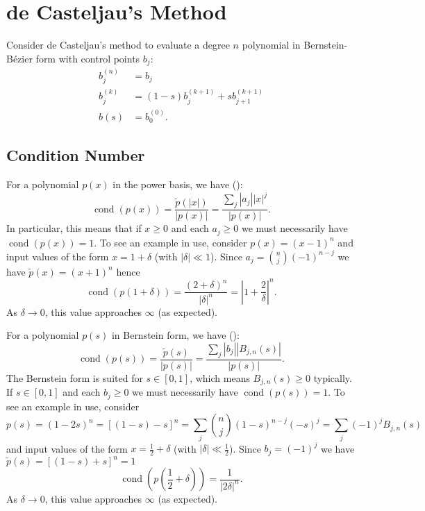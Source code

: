 \documentclass[letterpaper,10pt]{article}
\newcommand{\cond}[1]{\operatorname{cond}\left(#1\right)}
\begin{document}
\section{de Casteljau's Method}

Consider de Casteljau's method to evaluate a degree \(n\)
polynomial in Bernstein-B\'{e}zier form with control points \(b_j\):
\begin{align*}
    b_j^{(n)} &= b_j \\
    b_j^{(k)} &= (1 - s) b_j^{(k + 1)} + s b_{j + 1}^{(k + 1)} \\
    b(s) &= b_0^{(0)}.
\end{align*}

\subsection{Condition Number}

For a polynomial \(p(x)\) in the power basis, we have
(\cite{langlois_et_al:DSP:2006:442}):
\[\cond{p(x)} = \frac{\widetilde{p}\left(\left|x\right|\right)}{
  \left|p(x)\right|} = \frac{\sum_j \left|a_j\right| \left|x\right|^j}{
  \left|p(x)\right|}.\]
In particular, this means that if \(x \geq 0\) and each \(a_j \geq 0\)
we must necessarily have \(\cond{p(x)} = 1\). To see an example in use,
consider \(p(x) = (x - 1)^n\) and input values of the form \(x = 1 + \delta\)
(with \(\left|\delta\right| \ll 1\)). Since \(a_j = \binom{n}{j} (-1)^{n - j}\)
we have \(\widetilde{p}(x) = (x + 1)^n\) hence
\[\cond{p\left(1 + \delta\right)} = \frac{(2 + \delta)^n}{
  \left|\delta\right|^n} = \left|1 + \frac{2}{\delta}\right|^n.\]
As \(\delta \to 0\), this value approaches \(\infty\) (as expected).

For a polynomial \(p(s)\) in Bernstein form, we have (\cite{Jiang2010}):
\[\cond{p(s)} = \frac{\widetilde{p}\left(s\right)}{
  \left|p(s)\right|} = \frac{\sum_j \left|b_j\right| \left|B_{j, n}(s)\right|}{
  \left|p(s)\right|}.\]
The Bernstein form is suited for \(s \in \left[0, 1\right]\), which means
\(B_{j, n}(s) \geq 0\) typically. If \(s \in \left[0, 1\right]\) and each
\(b_j \geq 0\) we must necessarily have \(\cond{p(s)} = 1\). To see an
example in use, consider
\[p(s) = (1 - 2s)^n = \left[(1 - s) - s\right]^n = \sum_j \binom{n}{j}
(1 - s)^{n - j} (-s)^j = \sum_j (-1)^j B_{j, n}(s)\]
and input values of the form \(x = \frac{1}{2} + \delta\)
(with \(\left|\delta\right| \ll \frac{1}{2}\)). Since \(b_j = (-1)^j\)
we have \(\widetilde{p}(s) = \left[(1 - s) + s\right]^n = 1\)
\[\cond{p\left(\frac{1}{2} + \delta\right)} = \frac{1}{
  \left|2\delta\right|^n}.\]
As \(\delta \to 0\), this value approaches \(\infty\) (as expected).
\end{document}
